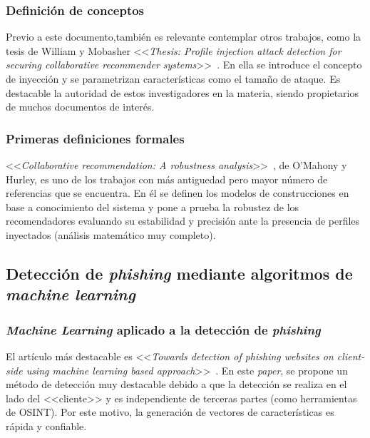 \subsubsection{Definición de conceptos~\cite{Mobasher2006Thesis}}
Previo a este documento,también es relevante contemplar otros trabajos, como la tesis de William y Mobasher <<\textit{Thesis: Profile injection attack detection for securing collaborative recommender systems}>>~\cite{Mobasher2006Thesis}. En ella se introduce el concepto de inyección y se parametrizan características como el tamaño de ataque. Es destacable la autoridad de estos investigadores en la materia, siendo propietarios de muchos documentos de interés.

\subsubsection{Primeras definiciones formales~\citep{mahony2004CollaborativeRecommendation}}
<<\textit{Collaborative recommendation: A robustness analysis}>>~\cite{mahony2004CollaborativeRecommendation}, de O'Mahony y Hurley, es uno de los trabajos con más antiguedad pero mayor número de referencias que se encuentra. En él se definen los modelos de construcciones en base a conocimiento del sistema y pone a prueba la robustez de los recomendadores evaluando su estabilidad y precisión ante la presencia de perfiles inyectados (análisis matemático muy completo).

\subsection{Detección de \textit{phishing} mediante algoritmos de \textit{machine learning}}

\subsubsection{\textit{Machine Learning} aplicado a la detección de \textit{phishing}}
El artículo más destacable es <<\textit{Towards detection of phishing websites on client-side using machine learning based approach}>>~\cite{featuresPhishing2018Gupta}. En este \textit{paper}, se propone un método de detección muy destacable debido a que la detección se realiza en el lado del <<cliente>> y es independiente de terceras partes (como herramientas de OSINT). Por este motivo, la generación de vectores de características es rápida y confiable.